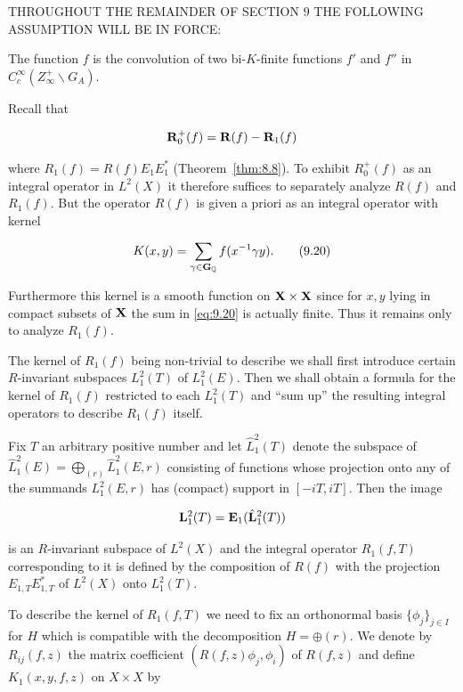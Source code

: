 THROUGHOUT THE REMAINDER OF SECTION 9 THE FOLLOWING ASSUMPTION WILL BE IN FORCE:

\begin{assumption}\label{ass:9.1}

The function $f$ is the convolution of two bi-$K$-finite functions $f'$ and $f''$ in $C_c^\infty(Z_\infty^{+} \backslash G_A)$.

\end{assumption}

Recall that

\[
\mathbf{R}_0^{+}(f) = \mathbf{R}(f) - \mathbf{R}_1(f)
\]

where $R_1(f) = R(f)E_1E_1^{*}$ (Theorem~\ref{thm:8.8}). To exhibit $R_0^{+}(f)$ as an integral operator in $L^2(X)$ it therefore suffices to separately analyze $R(f)$ and $R_1(f)$. But the operator $R(f)$ is given a priori as an integral operator with kernel

\begin{equation}\label{eq:9.20}
K(x, y) = \sum_{\gamma \in \mathbf{G}_{\mathbb{Q}}} f(x^{-1}\gamma y).\tag{9.20}
\end{equation}

Furthermore this kernel is a smooth function on $\mathbf{X} \times \mathbf{X}$ since for $x, y$ lying in compact subsets of $\mathbf{X}$ the sum in \eqref{eq:9.20} is actually finite. Thus it remains only to analyze $R_1(f)$.

The kernel of $R_1(f)$ being non-trivial to describe we shall first introduce certain $R$-invariant subspaces $L_1^2(T)$ of $L_1^2(E)$. Then we shall obtain a formula for the kernel of $R_1(f)$ restricted to each $L_1^2(T)$ and ``sum up'' the resulting integral operators to describe $R_1(f)$ itself.

Fix $T$ an arbitrary positive number and let $\hat{L}_1^2(T)$ denote the subspace of $\hat{L}_1^2(E) = \bigoplus_{(r)} \hat{L}_1^2(E, r)$ consisting of functions whose projection onto any of the summands $L_1^2(E, r)$ has (compact) support in $[-iT, iT]$. Then the image

\[
\mathbf{L}_1^2(T) = \mathbf{E}_1(\hat{\mathbf{L}}_1^2(T))
\]

is an $R$-invariant subspace of $L^2(X)$ and the integral operator $R_1(f,T)$ corresponding to it is defined by the composition of $R(f)$ with the projection $E_{1,T}E_{1,T}^{*}$ of $L^2(X)$ onto $L_1^2(T)$.

To describe the kernel of $R_1(f, T)$ we need to fix an orthonormal basis $\{\phi_j\}_{j \in I}$ for $H$ which is compatible with the decomposition $H = \oplus(r)$. We denote by $R_{ij}(f, z)$ the matrix coefficient $(R(f, z)\phi_j, \phi_i)$ of $R(f, z)$ and define $K_1(x, y, f, z)$ on $X \times X$ by

